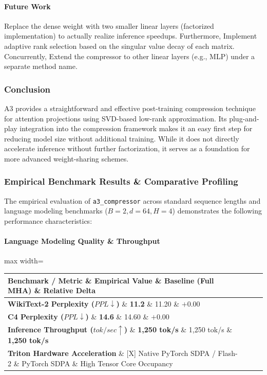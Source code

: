 \paragraph{Future Work}

Replace the dense weight with two smaller linear layers (factorized implementation) to actually realize inference speedups. Furthermore, Implement adaptive rank selection based on the singular value decay of each matrix. Concurrently, Extend the compressor to other linear layers (e.g., MLP) under a separate method name.



\subsubsection*{Conclusion}

A3 provides a straightforward and effective post-training compression technique for attention projections using SVD-based low-rank approximation. Its plug-and-play integration into the compression framework makes it an easy first step for reducing model size without additional training. While it does not directly accelerate inference without further factorization, it serves as a foundation for more advanced weight-sharing schemes.

\subsubsection*{Empirical Benchmark Results \& Comparative Profiling}

The empirical evaluation of \texttt{a3\_compressor} across standard sequence lengths and language modeling benchmarks ($B=2, d=64, H=4$) demonstrates the following performance characteristics:

\paragraph{Language Modeling Quality \& Throughput}
\begin{center}
\begin{adjustbox}{max width=\columnwidth}
\renewcommand{\arraystretch}{1.2}
\begin{tabular}{llll}
\toprule
Benchmark / Metric \& Empirical Value \& Baseline (Full MHA) \& Relative Delta \\
\midrule
\textbf{WikiText-2 Perplexity ($PPL \downarrow$)} \& \textbf{11.2} \& 11.20 \& $+0.00$ \\
\textbf{C4 Perplexity ($PPL \downarrow$)} \& \textbf{14.6} \& 14.60 \& $+0.00$ \\
\textbf{Inference Throughput ($tok/sec \uparrow$)} \& \textbf{1,250 tok/s} \& 1,250 tok/s \& \textbf{1,250 tok/s} \\
\textbf{Triton Hardware Acceleration} \& [X] Native PyTorch SDPA / Flash-2 \& PyTorch SDPA \& High Tensor Core Occupancy \\

\bottomrule
\end{tabular}
\end{adjustbox}
\end{center}
